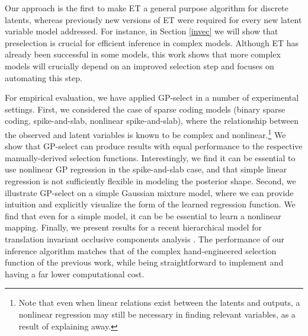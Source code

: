 


Our approach is the first to make ET a general purpose algorithm for discrete latents,%
 whereas previously new versions of ET were required for every new latent variable model addressed. 
For instance, in Section \ref{invec} we will show that preselection is crucial for efficient inference in complex models. 
Although ET has already been successful in some models, this work shows that more complex models will crucially depend on an improved selection step and focuses on automating this step.

For empirical evaluation, we have applied GP-select in a number of experimental settings.
First, we considered the case of sparse coding models (binary sparse coding,
spike-and-slab, nonlinear spike-and-slab), where the relationship between the
observed and latent variables is known to be complex and nonlinear.\footnote{Note that
 even when linear relations exist between the latents and outputs, a nonlinear
regression may still be necessary in finding relevant variables,
as a result of explaining away.}
%
We show that GP-select can produce results with equal performance to the respective manually-derived selection functions.
%
Interestingly, we find it can be essential to use nonlinear GP regression
in the spike-and-slab case, and that simple linear regression is not
sufficiently flexible in modeling the posterior shape.
%
Second, we illustrate GP-select on a simple Gaussian mixture model,
where we can provide intuition and explicitly visualize the form of the learned regression function.
We find that even for a simple model, it can be be essential to learn a nonlinear mapping.
%
Finally, we present results
for a recent hierarchical model for translation invariant occlusive components analysis
\citep{DaiLucke2014}.
The performance of our inference algorithm matches that of the complex
hand-engineered selection function of the previous work, while being straightforward
to implement and having a far lower computational cost.

